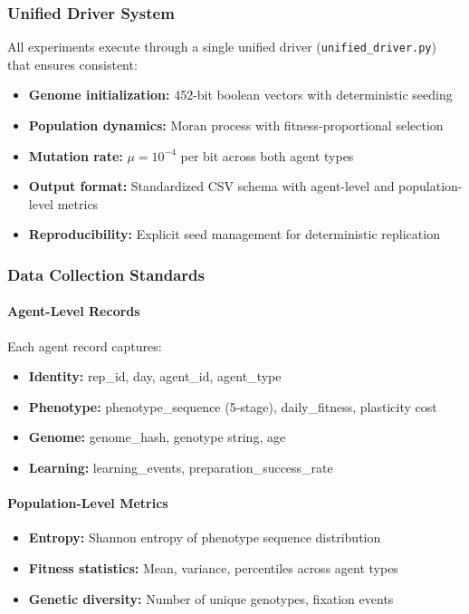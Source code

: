 \documentclass[aps,pre,twocolumn,floatfix,nofootinbib,amsmath,amssymb]{revtex4-2}
\begin{document}
\subsubsection{Unified Driver System}

All experiments execute through a single unified driver (\texttt{unified\_driver.py}) that ensures consistent:
\begin{itemize}
\item \textbf{Genome initialization:} 452-bit boolean vectors with deterministic seeding
\item \textbf{Population dynamics:} Moran process with fitness-proportional selection
\item \textbf{Mutation rate:} $\mu = 10^{-4}$ per bit across both agent types
\item \textbf{Output format:} Standardized CSV schema with agent-level and population-level metrics
\item \textbf{Reproducibility:} Explicit seed management for deterministic replication
\end{itemize}

\subsubsection{Data Collection Standards}

\paragraph{Agent-Level Records}
Each agent record captures:
\begin{itemize}
\item \textbf{Identity:} rep\_id, day, agent\_id, agent\_type
\item \textbf{Phenotype:} phenotype\_sequence (5-stage), daily\_fitness, plasticity cost
\item \textbf{Genome:} genome\_hash, genotype string, age
\item \textbf{Learning:} learning\_events, preparation\_success\_rate
\end{itemize}

\paragraph{Population-Level Metrics}
\begin{itemize}
\item \textbf{Entropy:} Shannon entropy of phenotype sequence distribution
\item \textbf{Fitness statistics:} Mean, variance, percentiles across agent types
\item \textbf{Genetic diversity:} Number of unique genotypes, fixation events
\end{itemize}
\end{document}
